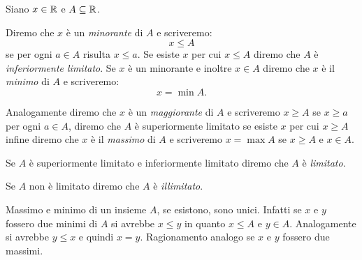 \begin{definition}
  \label{def:minorante}%
  \label{def:maggiorante}%
  \label{def:minimo}%
  \label{def:limitato}%
  Siano $x\in {\mathbb R}$ e $A\subseteq {\mathbb R}$.

  Diremo che $x$ è un \emph{minorante}%
%
 di $A$ e scriveremo:
  \[
    x \le A
  \]
  se per ogni $a\in A$ risulta $x\le a$. 
  Se esiste $x$ per cui $x\le A$ diremo che $A$ 
  è \emph{inferiormente limitato}.
  Se $x$ è un minorante e inoltre $x\in A$ diremo 
  che $x$ è il \emph{minimo}%
%
 di $A$ e scriveremo:
  \[
    x = \min A.  
  \] 

  Analogamente diremo che $x$ è un \emph{maggiorante}%
%
  di $A$ e scriveremo $x \ge A$ se $x\ge a$ per ogni $a\in A$,
  diremo che $A$ è superiormente limitato 
  se esiste $x$ per cui $x \ge A$ infine
  diremo che $x$ è il \emph{massimo}%
%
 di $A$ 
  e scriveremo $x=\max A$ se $x\ge A$ e $x\in A$.

  Se $A$ è superiormente limitato e inferiormente limitato
  diremo che $A$ è \emph{limitato}.

  Se $A$ non è limitato diremo che $A$ è \emph{illimitato}.
\end{definition}

Massimo e minimo di un insieme $A$, se esistono, sono unici.
Infatti se $x$ e $y$ fossero due minimi di $A$ si avrebbe $x\le y$ in
quanto $x\le A$ e $y\in A$. Analogamente si avrebbe $y\le x$ e
quindi $x=y$. Ragionamento analogo se $x$ e $y$ fossero due massimi.



